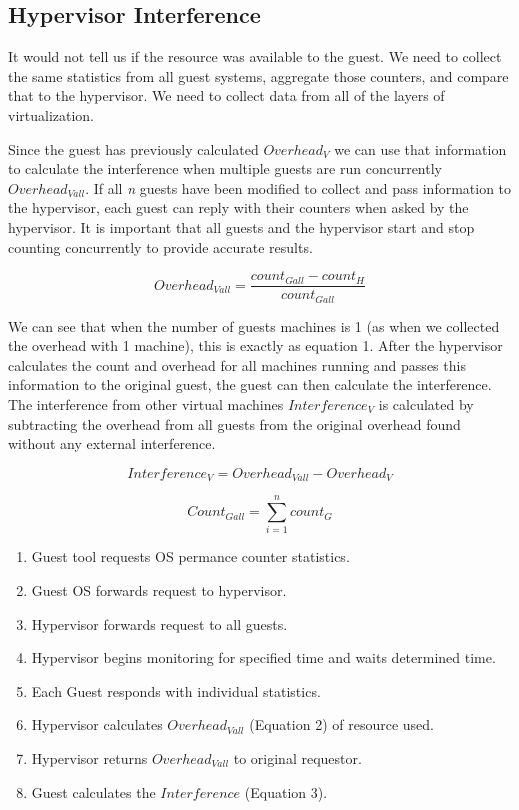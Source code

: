\subsection{Hypervisor Interference}
It would not tell us if the resource was available to the guest.
We need to collect the same statistics from all guest systems, aggregate those counters, and compare that to the hypervisor.  We need to collect data from all of the layers of virtualization.

Since the guest has previously calculated $ Overhead_V $ we can use that information to calculate the interference when multiple guests are run concurrently $ Overhead_{Vall}$.  If all \emph{n} guests have been modified to collect and pass information to the hypervisor, each guest can reply with their counters when asked by the hypervisor.  It is important that all guests and the hypervisor start and stop counting concurrently to provide accurate results.  

\begin{equation}
Overhead_{Vall} = \frac{count_{Gall} - count_H}{count_{Gall}} 
\label{eq2}
\end{equation}

\indent We can see that when the number of guests machines is 1 (as when we collected the overhead with 1 machine), this is exactly as equation 1.  After the hypervisor calculates the count and overhead for all machines running and passes this information to the original guest, the guest can then calculate the interference.  
The interference from other virtual machines $Interference_V$ is calculated by subtracting the overhead from all guests from the original overhead found without any external interference. 

\begin{equation}
Interference_V = Overhead_{Vall} - Overhead_V
\label{eq3}
\end{equation}


\begin{equation}
	Count_{Gall} = \sum_{i=1}^n{count_G} 
\end{equation}

\begin{enumerate}
	\item Guest tool requests OS permance counter statistics.
	\item Guest OS forwards request to hypervisor.
	\item Hypervisor forwards request to all guests.
	\item Hypervisor begins monitoring for specified time and waits determined time.
	\item Each Guest responds with individual statistics.
	\item Hypervisor calculates $Overhead_{Vall}$ (Equation 2) of resource used.
	\item Hypervisor returns $Overhead_{Vall}$ to original requestor.
	\item Guest calculates the $Interference$ (Equation 3).
\end{enumerate}

